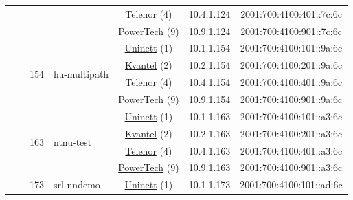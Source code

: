 \begin{small}
\begin{center}
\begin{longtable}{|c|c|c|c|c|c|c|c|}
  &  &  &  & \multicolumn{2}{|c|}{\tiny{\href{https://www.telenor.no}{Telenor} (4)}} & \tiny{10.4.1.124} & \tiny{2001:700:4100:401::7c:6c} \\* \cline{5-5}\cline{6-6}\cline{7-7}\cline{8-8}
  &  &  &  & \multicolumn{2}{|c|}{\tiny{\href{http://www.powertech.no}{PowerTech} (9)}} & \tiny{10.9.1.124} & \tiny{2001:700:4100:901::7c:6c} \\* \cline{3-3}\cline{4-4}\cline{5-5}\cline{6-6}\cline{7-7}\cline{8-8}
  &  & \multirow{4}{*}{\tiny{154}} & \multicolumn{1}{|l|}{\multirow{4}{*}{\tiny{hu-multipath}}} & \multicolumn{2}{|c|}{\tiny{\href{https://www.uninett.no}{Uninett} (1)}} & \tiny{10.1.1.154} & \tiny{2001:700:4100:101::9a:6c} \\* \cline{5-5}\cline{6-6}\cline{7-7}\cline{8-8}
  &  &  &  & \multicolumn{2}{|c|}{\tiny{\href{http://kvantel.no}{Kvantel} (2)}} & \tiny{10.2.1.154} & \tiny{2001:700:4100:201::9a:6c} \\* \cline{5-5}\cline{6-6}\cline{7-7}\cline{8-8}
  &  &  &  & \multicolumn{2}{|c|}{\tiny{\href{https://www.telenor.no}{Telenor} (4)}} & \tiny{10.4.1.154} & \tiny{2001:700:4100:401::9a:6c} \\* \cline{5-5}\cline{6-6}\cline{7-7}\cline{8-8}
  &  &  &  & \multicolumn{2}{|c|}{\tiny{\href{http://www.powertech.no}{PowerTech} (9)}} & \tiny{10.9.1.154} & \tiny{2001:700:4100:901::9a:6c} \\* \cline{3-3}\cline{4-4}\cline{5-5}\cline{6-6}\cline{7-7}\cline{8-8}
  &  & \multirow{4}{*}{\tiny{163}} & \multicolumn{1}{|l|}{\multirow{4}{*}{\tiny{ntnu-test}}} & \multicolumn{2}{|c|}{\tiny{\href{https://www.uninett.no}{Uninett} (1)}} & \tiny{10.1.1.163} & \tiny{2001:700:4100:101::a3:6c} \\* \cline{5-5}\cline{6-6}\cline{7-7}\cline{8-8}
  &  &  &  & \multicolumn{2}{|c|}{\tiny{\href{http://kvantel.no}{Kvantel} (2)}} & \tiny{10.2.1.163} & \tiny{2001:700:4100:201::a3:6c} \\* \cline{5-5}\cline{6-6}\cline{7-7}\cline{8-8}
  &  &  &  & \multicolumn{2}{|c|}{\tiny{\href{https://www.telenor.no}{Telenor} (4)}} & \tiny{10.4.1.163} & \tiny{2001:700:4100:401::a3:6c} \\* \cline{5-5}\cline{6-6}\cline{7-7}\cline{8-8}
  &  &  &  & \multicolumn{2}{|c|}{\tiny{\href{http://www.powertech.no}{PowerTech} (9)}} & \tiny{10.9.1.163} & \tiny{2001:700:4100:901::a3:6c} \\* \cline{3-3}\cline{4-4}\cline{5-5}\cline{6-6}\cline{7-7}\cline{8-8}
  &  & \multirow{4}{*}{\tiny{173}} & \multicolumn{1}{|l|}{\multirow{4}{*}{\tiny{srl-nndemo}}} & \multicolumn{2}{|c|}{\tiny{\href{https://www.uninett.no}{Uninett} (1)}} & \tiny{10.1.1.173} & \tiny{2001:700:4100:101::ad:6c} \\* \cline{5-5}\cline{6-6}\cline{7-7}\cline{8-8}

\end{longtable}
\end{center}
\end{small}
